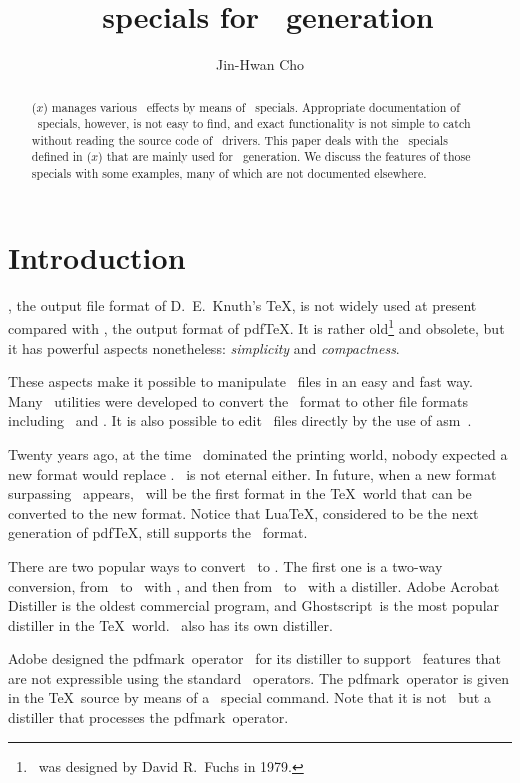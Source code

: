 \documentclass[final]{ltugboat}
\title{\DVI\ specials for \PDF\ generation}
\author{Jin-Hwan Cho}
\def\DVIasm{\acro{DVI}asm}
\def\DPS{\acro{DVIPS}}
\def\pdfmark{pdfmark}
\def\GS{Ghostscript}
\def\pdfTeX{pdf\/\TeX}
\def\LuaTeX{Lua\TeX}
\let\note=\footnote
\begin{document}
\maketitle

\begin{abstract}%
($x$) manages various \PDF\ effects by means of \DVI\ specials.
Appropriate documentation of \DVI\ specials, however, is not easy to find, and exact functionality is not simple to catch without reading the source code of \DVI\ drivers.
This paper deals with the \DVI\ specials defined in ($x$) that are mainly used for \PDF\ generation.
We discuss the features of those specials with some examples, many of which are not documented elsewhere.
\end{abstract}

\section{Introduction}

\DVI, the output file format of D.~E.~Knuth's \TeX, is not widely used at present compared with \PDF, the output format of \pdfTeX.
It is rather old\note{\DVI\ was designed by David R.~Fuchs in 1979.} and obsolete, but it has powerful aspects nonetheless: \emph{simplicity} and \emph{compactness}.

These aspects make it possible to manipulate \DVI\ files in an easy and fast way.
Many \DVI\ utilities were developed to convert the \DVI\ format to other file formats including \PS\ and \PDF.
It is also possible to edit \DVI\ files directly by the use of \DVIasm~\cite{Cho07,Cho08,DVIasm}.

Twenty years ago, at the time \PS\ dominated the printing world, nobody expected a new format would replace \PS.
\PDF\ is not eternal either.
In future, when a new format surpassing \PDF\ appears, \DVI\ will be the first format in the \TeX\ world that can be converted to the new format.
Notice that \LuaTeX, considered to be the next generation of \pdfTeX, still supports the \DVI\ format.

There are two popular ways to convert \DVI\ to \PDF.
The first one is a two-way conversion, from \DVI\ to \PS\ with \DPS, and then from \PS\ to \PDF\ with a distiller.
Adobe Acrobat Distiller is the oldest commercial program, and \GS\ is the most popular distiller in the \TeX\ world. \MacOSX\ also has its own distiller.

Adobe designed the \pdfmark\ operator~\cite{pdfmark} for its distiller to support \PDF\ features that are not expressible using the standard \PS\ operators.
The \pdfmark\ operator is given in the \TeX\ source by means of a \DVI\ special command.
Note that it is not \DPS\ but a distiller that processes the \pdfmark\ operator.
\end{document}

